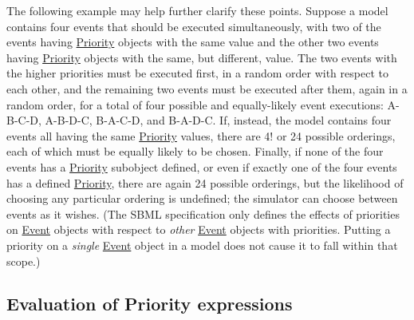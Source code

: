 The following example may help further clarify these points. Suppose a model contains four events that should be executed simultaneously, with two of the events having \hyperlink{class_priority}{Priority} objects with the same value and the other two events having \hyperlink{class_priority}{Priority} objects with the same, but different, value. The two events with the higher priorities must be executed first, in a random order with respect to each other, and the remaining two events must be executed after them, again in a random order, for a total of four possible and equally-\/likely event executions\+: A-\/\+B-\/\+C-\/D, A-\/\+B-\/\+D-\/C, B-\/\+A-\/\+C-\/D, and B-\/\+A-\/\+D-\/C. If, instead, the model contains four events all having the same \hyperlink{class_priority}{Priority} values, there are 4! or 24 possible orderings, each of which must be equally likely to be chosen. Finally, if none of the four events has a \hyperlink{class_priority}{Priority} subobject defined, or even if exactly one of the four events has a defined \hyperlink{class_priority}{Priority}, there are again 24 possible orderings, but the likelihood of choosing any particular ordering is undefined; the simulator can choose between events as it wishes. (The S\+B\+ML specification only defines the effects of priorities on \hyperlink{class_event}{Event} objects with respect to {\itshape other} \hyperlink{class_event}{Event} objects with priorities. Putting a priority on a {\itshape single} \hyperlink{class_event}{Event} object in a model does not cause it to fall within that scope.)\hypertarget{class_priority_priority-eval}{}\subsection{Evaluation of Priority expressions}\label{class_priority_priority-eval}
